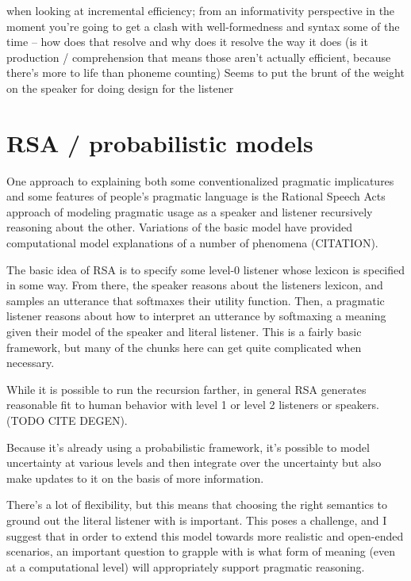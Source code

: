 \documentclass[]{article}
\begin{document}
\cite{rubio-fernandez2021} when looking at incremental efficiency; from an informativity perspective in the moment you're going to get a clash with well-formedness and syntax some of the time -- how does that resolve and why does it resolve the way it does (is it production / comprehension that means those aren't actually efficient, because there's more to life than phoneme counting) Seems to put the brunt of the weight on the speaker for doing design for the listener 







\section{RSA / probabilistic models }

One approach to explaining both some conventionalized pragmatic implicatures and some features of people's pragmatic language is the Rational Speech Acts approach of modeling pragmatic usage as a speaker and listener recursively reasoning about the other. Variations of the basic model have provided computational model explanations of a number of phenomena (CITATION). 

The basic idea of RSA is to specify some level-0 listener whose lexicon is specified in some way. From there, the speaker reasons about the listeners lexicon, and samples an utterance that softmaxes their utility function. Then, a pragmatic listener reasons about how to interpret an utterance by softmaxing a meaning given their model of the speaker and literal listener. This is a fairly basic framework, but many of the chunks here can get quite complicated when necessary. 

While it is possible to run the recursion farther, in general RSA generates reasonable fit to human behavior with level 1 or level 2 listeners or speakers. (TODO CITE DEGEN). 

Because it's already using a probabilistic framework, it's possible to model uncertainty at various levels and then integrate over the uncertainty but also make updates to it on the basis of more information. 

There's a lot of flexibility, but this means that choosing the right semantics to ground out the literal listener with is important. This poses a challenge, and I suggest that in order to extend this model towards more realistic and open-ended scenarios, an important question to grapple with is what form of meaning (even at a computational level) will appropriately support pragmatic reasoning. 
\end{document}
